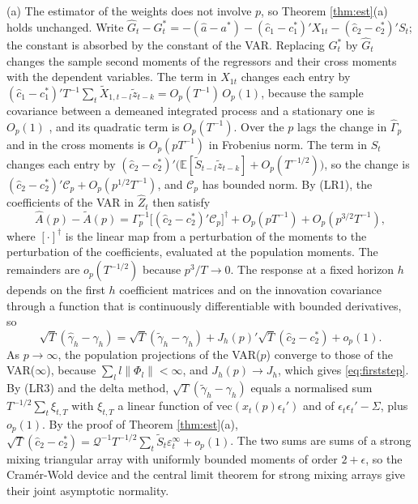 \documentclass[12pt,a4paper]{article}
\theoremstyle{definition}
\theoremstyle{definition}\newtheorem{example}{Example}
\theoremstyle{definition}\newtheorem{definition}{Definition}
\newcommand{\E}{\mathbb{E}}
\begin{document}
(a) The estimator of the weights does not involve $p$, so Theorem \ref{thm:est}(a) holds unchanged. Write $\hat G_t-G^\ast_t=-(\hat a-a^\ast)-(\hat c_1-c_1^\ast)'X_{1t}-(\hat c_2-c_2^\ast)'S_t$; the constant is absorbed by the constant of the VAR. Replacing $G^\ast_t$ by $\hat G_t$ changes the sample second moments of the regressors and their cross moments with the dependent variables. The term in $X_{1t}$ changes each entry by $(\hat c_1-c_1^\ast)'T^{-1}\sum_t\tilde X_{1,t-l}\tilde z_{t-k}=O_p(T^{-1})\,O_p(1)$, because the sample covariance between a demeaned integrated process and a stationary one is $O_p(1)$ \citep{Phillips1988}, and its quadratic term is $O_p(T^{-1})$. Over the $p$ lags the change in $\hat\Gamma_p$ and in the cross moments is $O_p(pT^{-1})$ in Frobenius norm. The term in $S_t$ changes each entry by $(\hat c_2-c_2^\ast)'\big(\E[\tilde S_{t-l}\tilde z_{t-k}]+O_p(T^{-1/2})\big)$, so the change is $(\hat c_2-c_2^\ast)'\mathcal C_p+O_p(p^{1/2}T^{-1})$, and $\mathcal C_p$ has bounded norm. By (LR1), the coefficients of the VAR in $\hat Z_t$ then satisfy
\[
\hat A(p)-\tilde A(p)=\Gamma_p^{-1}\big[(\hat c_2-c_2^\ast)'\mathcal C_p\big]^{\dagger}+O_p(pT^{-1})+O_p(p^{3/2}T^{-1}),
\]
where $[\cdot]^\dagger$ is the linear map from a perturbation of the moments to the perturbation of the coefficients, evaluated at the population moments. The remainders are $o_p(T^{-1/2})$ because $p^3/T\to0$. The response at a fixed horizon $h$ depends on the first $h$ coefficient matrices and on the innovation covariance through a function that is continuously differentiable with bounded derivatives, so
\[
\sqrt{T}(\hat\gamma_h-\gamma_h)=\sqrt{T}(\tilde\gamma_h-\gamma_h)+J_h(p)'\sqrt{T}(\hat c_2-c_2^\ast)+o_p(1).
\] As $p\to\infty$, the population projections of the VAR($p$) converge to those of the VAR($\infty$), because $\sum_l l\|\Phi_l\|<\infty$, and $J_h(p)\to J_h$, which gives \eqref{eq:firststep}. By (LR3) and the delta method, $\sqrt{T}(\tilde\gamma_h-\gamma_h)$ equals a normalised sum $T^{-1/2}\sum_t\xi_{t,T}$ with $\xi_{t,T}$ a linear function of $\mathrm{vec}(x_t(p)\epsilon_t')$ and of $\epsilon_t\epsilon_t'-\Sigma$, plus $o_p(1)$. By the proof of Theorem \ref{thm:est}(a), $\sqrt{T}(\hat c_2-c_2^\ast)=\mathcal Q^{-1}T^{-1/2}\sum_t\tilde S_t\varepsilon^\infty_t+o_p(1)$. The two sums are sums of a strong mixing triangular array with uniformly bounded moments of order $2+\epsilon$, so the Cram\'er-Wold device and the central limit theorem for strong mixing arrays give their joint asymptotic normality.
\end{document}
